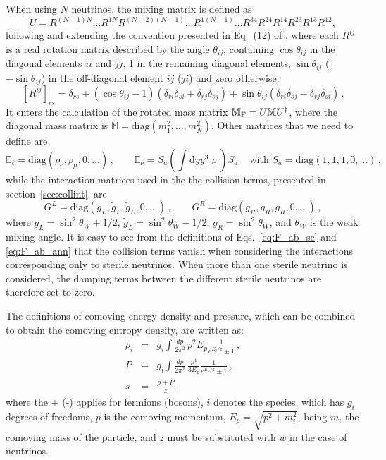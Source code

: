 \documentclass[notitlepage,showpacs,preprintnumbers,amsmath,amssymb,superscriptaddress,prd,onecolumn]{revtex4-1}
\begin{document}
When using $N$ neutrinos,
the mixing matrix is defined as
%
\begin{equation}\label{eq:mixing_matrix_nxn}
U=R^{(N-1)N} \ldots R^{1N}
R^{(N-2)(N-1)}\ldots R^{1(N-1)}
\ldots
R^{34} R^{24} R^{14} R^{23} R^{13} R^{12},
\end{equation}
%
following and extending the convention presented in Eq.~(12) of \cite{Gariazzo:2015rra},
where each $R^{ij}$ is a real rotation matrix described by the angle $\theta_{ij}$,
containing $\cos\theta_{ij}$ in the diagonal elements $ii$ and $jj$,
1 in the remaining diagonal elements,
$\sin\theta_{ij}$ ($-\sin\theta_{ij}$) in the off-diagonal element $ij$ ($ji$)
and zero otherwise:
\begin{equation}
\label{eq:rotationmatrix}
[R^{ij}]_{rs}=
\delta_{rs}
+
(\cos\theta_{ij}-1)(\delta_{ri}\delta_{si}+\delta_{rj}\delta_{sj})
+
\sin\theta_{ij}(\delta_{ri}\delta_{sj}-\delta_{rj}\delta_{si})\,.
\end{equation}
It enters the calculation of the rotated mass matrix
$\mathbb{M}_{\rm F}=U\mathbb{M}U^\dagger$,
where the diagonal mass matrix is
$\mathbb{M}=\text{diag}(m_1^2,\ldots,m_N^2)$.
Other matrices that we need to define are
%
\begin{equation}\label{eq:matterpotentials_nxn}
\mathbb{E}_\ell=\text{diag}(\rho_e, \rho_\mu, 0, \ldots)\,,
\qquad
\mathbb{E}_\nu=S_a\left(\int \mathrm{d}y y^3\varrho\right) S_a\,
\quad\mbox{with }S_a=\text{diag}(1,1,1,0,\ldots)\,,
\end{equation}
while the interaction matrices used in the the collision terms,
presented in section~\ref{sec:collint}, are
\begin{equation}
G^L=\text{diag}(g_L, \tilde g_L, \tilde g_L, 0,\ldots)\,,
\qquad
G^R=\text{diag}(g_R, g_R, g_R, 0,\ldots)\,,
\end{equation}
%
where $g_L=\sin^2\theta_W+1/2$, $\tilde g_L=\sin^2\theta_W - 1/2$, $g_R=\sin^2\theta_W$,
and $\theta_W$ is the weak mixing angle.
It is easy to see from the definitions of Eqs.~\eqref{eq:F_ab_sc} and \eqref{eq:F_ab_ann}
that the collision terms vanish when considering the interactions corresponding
only to sterile neutrinos.
When more than one sterile neutrino is considered, the damping terms between the different sterile neutrinos are therefore set to zero.

The definitions of comoving energy density and pressure,
which can be combined to obtain the comoving entropy density,
are written as:
\begin{eqnarray}
\rho_i
&=&
g_i
\int\frac{dp}{2\pi^2}\,
p^2 E_p \frac{1}{e^{E_p/z}\pm1}
\,,
\\
P
&=&
g_i
\int\frac{dp}{2\pi^2}\,
\frac{p^4}{3 E_p} \frac{1}{e^{E_p/z}\pm1}
\,,
\\
s
&=&
\frac{\rho+P}{z}
\,,
\end{eqnarray}
where the + (-) applies for fermions (bosons),
$i$ denotes the species, which has $g_i$ degrees of freedoms,
$p$ is the comoving momentum,
$E_p=\sqrt{p^2 + m_i^2}$, being $m_i$ the comoving mass of the particle,
and $z$ must be substituted with $w$ in the case of neutrinos.
\end{document}
